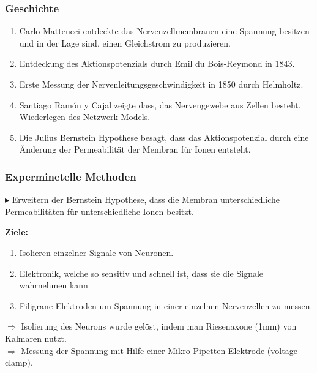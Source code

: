 \documentclass[ngerman]{beamer}
\begin{document}

\begin{frame}\frametitle{ Geschichte}

\begin{enumerate}[1:, leftmargin=1.2cm]
	\item Carlo Matteucci entdeckte das Nervenzellmembranen eine Spannung besitzen und in der Lage sind, einen Gleichstrom zu produzieren.
	\item Entdeckung des Aktionspotenzials durch Emil du Bois-Reymond in 1843.
	\item Erste Messung der Nervenleitungsgeschwindigkeit in 1850 durch Helmholtz.
	\item Santiago Ramón y Cajal zeigte dass, das Nervengewebe aus Zellen besteht. Wiederlegen des Netzwerk Models.
	\item Die Julius Bernstein Hypothese besagt, dass das Aktionspotenzial durch eine Änderung der Permeabilität der Membran für Ionen entsteht.
\end{enumerate}


\end{frame}


\begin{frame}\frametitle{ Experminetelle Methoden}

\noindent $\blacktriangleright$ Erweitern der Bernstein Hypothese, dass die Membran unterschiedliche Permeabilitäten für unterschiedliche Ionen besitzt. \newline

\noindent \textbf{Ziele:}

\begin{enumerate}[1:, leftmargin=1.2cm]
	\item Isolieren einzelner Signale von Neuronen.
	\item Elektronik, welche so sensitiv und schnell ist, dass sie die Signale wahrnehmen kann
	\item Filigrane Elektroden um Spannung in einer einzelnen Nervenzellen zu messen.
\end{enumerate}

\noindent $ \Rightarrow $ Isolierung des Neurons wurde gelöst, indem man Riesenaxone (1mm) von Kalmaren nutzt. \\
\noindent $ \Rightarrow $ Messung der Spannung mit Hilfe einer Mikro Pipetten Elektrode (voltage clamp).

\end{frame}
\end{document}
